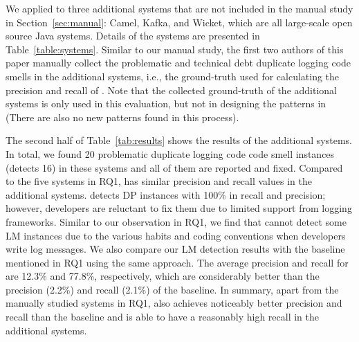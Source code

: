 We applied \toolS to three additional systems that are not included in the manual study in Section~\ref{sec:manual}: Camel, Kafka, and Wicket, which are all large-scale open source Java systems. Details of the systems are presented in Table~\ref{table:systems}. Similar to our manual study, the first two authors of this paper manually collect the problematic and technical debt duplicate logging code smells in the additional systems, i.e., the ground-truth used for calculating the precision and recall of \tool. Note that the collected ground-truth of the additional systems is only used in this evaluation, but not in designing the patterns in \toolS (There are also no new patterns found in this process).

The second half of Table~\ref{tab:results} shows the results of the additional systems. In total, we found 20 problematic duplicate logging code code smell instances (\toolS detects 16) in these systems and all of them are reported and fixed. Compared to the five systems in RQ1, \toolS has similar precision and recall values in the additional systems.
\toolS detects DP instances with 100\% in recall and precision; however, 
developers are reluctant to fix them due to limited support from logging frameworks. 
Similar to our observation in RQ1, we find that \toolS cannot detect some LM instances due to the various habits and coding conventions when developers write log messages. We also compare our LM detection results with the baseline mentioned in RQ1 using the same approach. The average precision and recall for \toolS are 12.3\% and 77.8\%, respectively, which are considerably better than the precision (2.2\%) and recall (2.1\%) of the baseline. In summary, apart from the manually studied systems in RQ1, \toolS also achieves noticeably better precision and recall than the baseline and is able to have a reasonably high recall in the additional systems.


